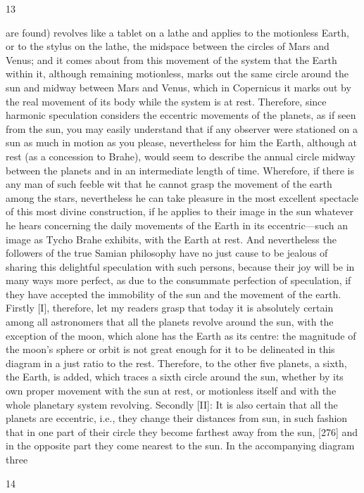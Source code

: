 \documentclass{article}
\begin{document}
13

are found) revolves like a tablet on a lathe and applies to the motionless
Earth, or to the stylus on the lathe, the midspace between the circles of
Mars and Venus; and it comes about from this movement of the system
that the Earth within it, although remaining motionless, marks out the
same circle around the sun and midway between Mars and Venus, which
in Copernicus it marks out by the real movement of its body while the
system is at rest. Therefore, since harmonic speculation considers the
eccentric movements of the planets, as if seen from the sun, you may
easily understand that if any observer were stationed on a sun as much
in motion as you please, nevertheless for him the Earth, although at rest
(as a concession to Brahe), would seem to describe the annual circle
midway between the planets and in an intermediate length of time.
Wherefore, if there is any man of such feeble wit that he cannot grasp the
movement of the earth among the stars, nevertheless he can take
pleasure in the most excellent spectacle of this most divine construction,
if he applies to their image in the sun whatever he hears concerning the
daily movements of the Earth in its eccentric—such an image as Tycho
Brahe exhibits, with the Earth at rest.
And nevertheless the followers of the true Samian philosophy have no
just cause to be jealous of sharing this delightful speculation with such
persons, because their joy will be in many ways more perfect, as due to
the consummate perfection of speculation, if they have accepted the
immobility of the sun and the movement of the earth.
Firstly [I], therefore, let my readers grasp that today it is absolutely
certain among all astronomers that all the planets revolve around the
sun, with the exception of the moon, which alone has the Earth as its
centre: the magnitude of the moon's sphere or orbit is not great enough
for it to be delineated in this diagram in a just ratio to the rest.
Therefore, to the other five planets, a sixth, the Earth, is added, which
traces a sixth circle around the sun, whether by its own proper
movement with the sun at rest, or motionless itself and with the whole
planetary system revolving.
Secondly [II]: It is also certain that all the planets are eccentric, i.e., they
change their distances from sun, in such fashion that in one part of their
circle they become farthest away from the sun, [276] and in the opposite
part they come nearest to the sun. In the accompanying diagram three


14
\end{document}
